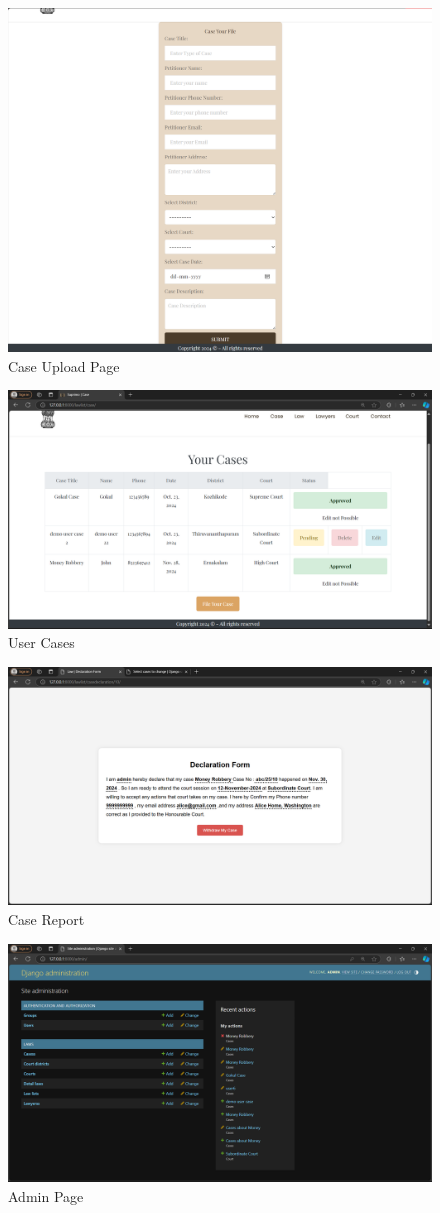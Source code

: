\begin{figure}
  \centering
  \includegraphics[width=0.5\linewidth]{caseuploadpage.png}
 \caption{Case Upload Page}
   \label{fig:Case Upload Page}
\end{figure}

\begin{figure}
  \centering
  \includegraphics[width=0.5\linewidth]{uploadedcases.png}
 \caption{User Cases}
   \label{fig:User Cases}
\end{figure}

\begin{figure}
  \centering
  \includegraphics[width=0.5\linewidth]{casereport.png}
 \caption{Case Report}
   \label{fig:Case Report}
\end{figure}

\begin{figure}
  \centering
  \includegraphics[width=0.5\linewidth]{adminpage.png}
 \caption{Admin Page}
   \label{fig:Admin Page}
\end{figure}

